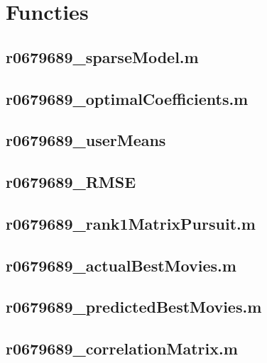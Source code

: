 \documentclass[11pt, a4paper, titlepage, openright]{article}
\begin{document}
\onecolumn
\appendix
\appendixpage
\addappheadtotoc

\section{Functies}

    \subsection{r0679689\_sparseModel.m}
        
        \label{appendix:sparseModel}
    \subsection{r0679689\_optimalCoefficients.m}
        
        \label{appendix:optimalCoefficients}
    \subsection{r0679689\_userMeans}
        
    \subsection{r0679689\_RMSE}
        
    \subsection{r0679689\_rank1MatrixPursuit.m}
        
    \subsection{r0679689\_actualBestMovies.m}
        
    \subsection{r0679689\_predictedBestMovies.m}
        \label{appendix:predictedBestMovies}
        
    \subsection{r0679689\_correlationMatrix.m}
        \label{appendix:correlationMatrix}
        
\end{document}

